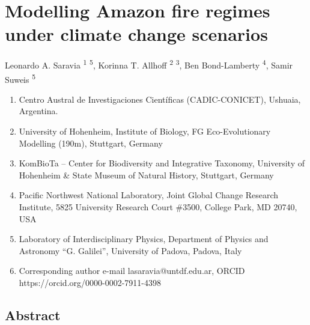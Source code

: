 \documentclass[
]{article}
\author{}
\date{}
\begin{document}
\section{Modelling Amazon fire regimes under climate change
scenarios}\label{modelling-amazon-fire-regimes-under-climate-change-scenarios}

Leonardo A. Saravia \textsuperscript{1} \textsuperscript{5}, Korinna T.
Allhoff \textsuperscript{2} \textsuperscript{3}, Ben Bond-Lamberty
\textsuperscript{4}, Samir Suweis \textsuperscript{5}

\begin{enumerate}
\def\labelenumi{\arabic{enumi}.}
\item
  Centro Austral de Investigaciones Científicas (CADIC-CONICET),
  Ushuaia, Argentina.
\item
  University of Hohenheim, Institute of Biology, FG Eco-Evolutionary
  Modelling (190m), Stuttgart, Germany
\item
  KomBioTa -- Center for Biodiversity and Integrative Taxonomy,
  University of Hohenheim \& State Museum of Natural History, Stuttgart,
  Germany
\item
  Pacific Northwest National Laboratory, Joint Global Change Research
  Institute, 5825 University Research Court \#3500, College Park, MD
  20740, USA
\item
  Laboratory of Interdisciplinary Physics, Department of Physics and
  Astronomy ``G. Galilei'', University of Padova, Padova, Italy
\item
  Corresponding author e-mail lasaravia@untdf.edu.ar, ORCID
  https://orcid.org/0000-0002-7911-4398
\end{enumerate}

\newpage

\subsection{Abstract}\label{abstract}
\end{document}
